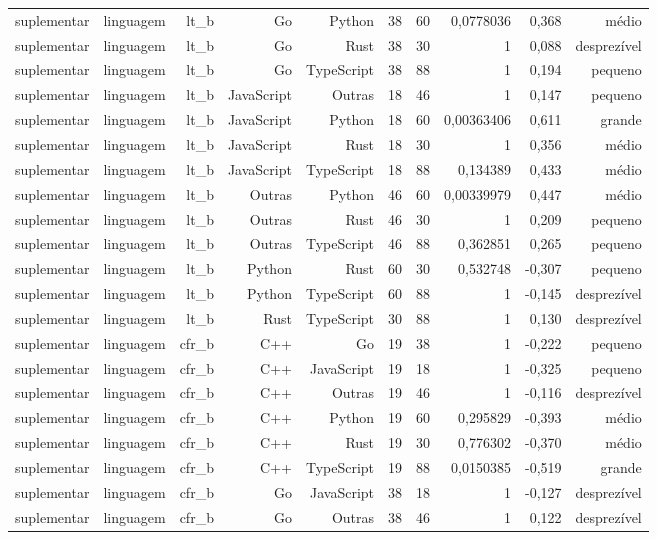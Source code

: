\begin{tabular}{lrrrrrrrrr}
suplementar & linguagem & lt\_b & Go & Python & 38 & 60 & 0,0778036 & 0,368 & médio \\
suplementar & linguagem & lt\_b & Go & Rust & 38 & 30 & 1 & 0,088 & desprezível \\
suplementar & linguagem & lt\_b & Go & TypeScript & 38 & 88 & 1 & 0,194 & pequeno \\
suplementar & linguagem & lt\_b & JavaScript & Outras & 18 & 46 & 1 & 0,147 & pequeno \\
suplementar & linguagem & lt\_b & JavaScript & Python & 18 & 60 & 0,00363406 & 0,611 & grande \\
suplementar & linguagem & lt\_b & JavaScript & Rust & 18 & 30 & 1 & 0,356 & médio \\
suplementar & linguagem & lt\_b & JavaScript & TypeScript & 18 & 88 & 0,134389 & 0,433 & médio \\
suplementar & linguagem & lt\_b & Outras & Python & 46 & 60 & 0,00339979 & 0,447 & médio \\
suplementar & linguagem & lt\_b & Outras & Rust & 46 & 30 & 1 & 0,209 & pequeno \\
suplementar & linguagem & lt\_b & Outras & TypeScript & 46 & 88 & 0,362851 & 0,265 & pequeno \\
suplementar & linguagem & lt\_b & Python & Rust & 60 & 30 & 0,532748 & -0,307 & pequeno \\
suplementar & linguagem & lt\_b & Python & TypeScript & 60 & 88 & 1 & -0,145 & desprezível \\
suplementar & linguagem & lt\_b & Rust & TypeScript & 30 & 88 & 1 & 0,130 & desprezível \\
suplementar & linguagem & cfr\_b & C++ & Go & 19 & 38 & 1 & -0,222 & pequeno \\
suplementar & linguagem & cfr\_b & C++ & JavaScript & 19 & 18 & 1 & -0,325 & pequeno \\
suplementar & linguagem & cfr\_b & C++ & Outras & 19 & 46 & 1 & -0,116 & desprezível \\
suplementar & linguagem & cfr\_b & C++ & Python & 19 & 60 & 0,295829 & -0,393 & médio \\
suplementar & linguagem & cfr\_b & C++ & Rust & 19 & 30 & 0,776302 & -0,370 & médio \\
suplementar & linguagem & cfr\_b & C++ & TypeScript & 19 & 88 & 0,0150385 & -0,519 & grande \\
suplementar & linguagem & cfr\_b & Go & JavaScript & 38 & 18 & 1 & -0,127 & desprezível \\
suplementar & linguagem & cfr\_b & Go & Outras & 38 & 46 & 1 & 0,122 & desprezível \\

\end{tabular}
